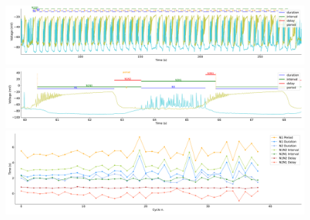 \begin{figure}[htbp]
	\centering
	\begin{minipage}[b]{\textwidth}
		\centering
		\includegraphics[width=\textwidth,height=0.1\textheight]{./invariants/data/SUSSEX/CV1a_driven1/images/stim_cv1a1_signal_intervals_zoom.pdf}
		\includegraphics[width=\textwidth]{./invariants/data/SUSSEX/CV1a_driven1/images/stim_cv1a1_signal_intervals_cycle.pdf}
		\includegraphics[width=\textwidth]{./invariants/data/SUSSEX/CV1a_driven1/images/stim_cv1a1_time_cycle.pdf}
	\end{minipage}
	\centering
	\begin{minipage}[b]{0.43\textwidth}
		\centering

\end{minipage}
\end{figure}
